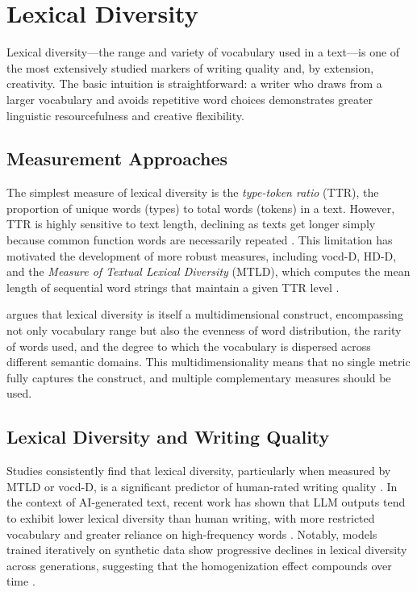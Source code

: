 \documentclass[12pt,a4paper]{article}
\begin{document}
\section{Lexical Diversity}

Lexical diversity---the range and variety of vocabulary used in a text---is one of the most extensively studied markers of writing quality and, by extension, creativity. The basic intuition is straightforward: a writer who draws from a larger vocabulary and avoids repetitive word choices demonstrates greater linguistic resourcefulness and creative flexibility.

\subsection{Measurement Approaches}

The simplest measure of lexical diversity is the \emph{type-token ratio} (TTR), the proportion of unique words (types) to total words (tokens) in a text. However, TTR is highly sensitive to text length, declining as texts get longer simply because common function words are necessarily repeated \citep{koizumi2012effects}. This limitation has motivated the development of more robust measures, including vocd-D, HD-D, and the \emph{Measure of Textual Lexical Diversity} (MTLD), which computes the mean length of sequential word strings that maintain a given TTR level \citep{mccarthy2010mtld}.

\citet{jarvis2013capturing} argues that lexical diversity is itself a multidimensional construct, encompassing not only vocabulary range but also the evenness of word distribution, the rarity of words used, and the degree to which the vocabulary is dispersed across different semantic domains. This multidimensionality means that no single metric fully captures the construct, and multiple complementary measures should be used.

\subsection{Lexical Diversity and Writing Quality}

Studies consistently find that lexical diversity, particularly when measured by MTLD or vocd-D, is a significant predictor of human-rated writing quality \citep{lu2012relationship, mccarthy2010mtld}. In the context of AI-generated text, recent work has shown that LLM outputs tend to exhibit lower lexical diversity than human writing, with more restricted vocabulary and greater reliance on high-frequency words \citep{benchmarking_diversity2024, frontiers_chatgpt_l2_2025}. Notably, models trained iteratively on synthetic data show progressive declines in lexical diversity across generations, suggesting that the homogenization effect compounds over time \citep{benchmarking_diversity2024}.
\end{document}
